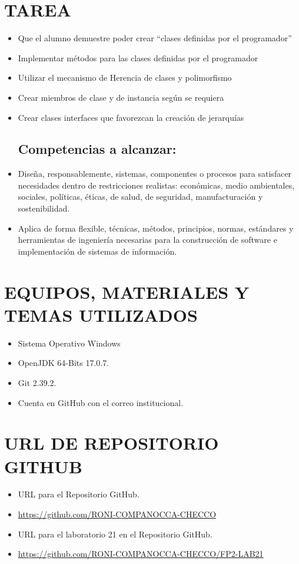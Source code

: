 \documentclass{article}
\begin{document}
    \section{TAREA}
	\begin{itemize}	
    \subsection{Objetivos:}
		\item Que el alumno demuestre poder crear “clases definidas por el programador”
		\item Implementar métodos para las clases definidas por el programador 
        \item Utilizar el mecanismo de Herencia de clases y polimorfismo
        \item Crear miembros de clase y de instancia según se requiera
        \item Crear clases interfaces que favorezcan la creación de jerarquías
        
       
    \subsection{Competencias a alcanzar:}
		\item Diseña, responsablemente, sistemas, componentes o procesos para satisfacer necesidades dentro de restricciones realistas: económicas, medio ambientales, sociales, políticas, éticas, de salud, de seguridad, manufacturación y sostenibilidad. 
        \item Aplica de forma flexible, técnicas, métodos, principios, normas, estándares y herramientas de ingeniería necesarias para la construcción de software e implementación de sistemas de información.
    \end{itemize}

    \section{EQUIPOS, MATERIALES Y TEMAS UTILIZADOS}
	\begin{itemize}
		\item Sistema Operativo Windows
		\item OpenJDK 64-Bits 17.0.7.
		\item Git 2.39.2.	
  	\item Cuenta en GitHub con el correo institucional.
	\end{itemize}

    \section{URL DE REPOSITORIO GITHUB}
	\begin{itemize}
		\item URL para el Repositorio GitHub.
		\item \url{https://github.com/RONI-COMPANOCCA-CHECCO}
		\item URL para el laboratorio 21 en el Repositorio GitHub.	
        \item \url{https://github.com/RONI-COMPANOCCA-CHECCO/FP2-LAB21}
	\end{itemize}
    
\end{document}
